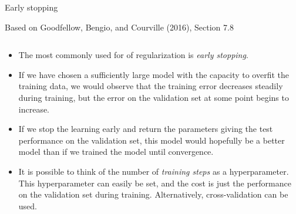 \documentclass[10pt,ignorenonframetext,]{beamer}
\providecommand{\tightlist}{%
  \setlength{\itemsep}{0pt}\setlength{\parskip}{0pt}}
\begin{document}
\begin{frame}

\begin{block}{Early stopping}

\tiny Based on Goodfellow, Bengio, and Courville (2016), Section 7.8

\normalsize

\(~\)

\begin{itemize}
\tightlist
\item
  The most commonly used for of regularization is \emph{early stopping}.
\end{itemize}

\vspace{2mm}

\begin{itemize}
\tightlist
\item
  If we have chosen a sufficiently large model with the capacity to
  overfit the training data, we would observe that the training error
  decreases steadily during training, but the error on the validation
  set at some point begins to increase.
\end{itemize}

\vspace{2mm}

\begin{itemize}
\tightlist
\item
  If we stop the learning early and return the parameters giving the
  test performance on the validation set, this model would hopefully be
  a better model than if we trained the model until convergence.
\end{itemize}

\vspace{2mm}

\begin{itemize}
\tightlist
\item
  It is possible to think of the number of \emph{training steps} as a
  hyperparameter. This hyperparameter can easily be set, and the cost is
  just the performance on the validation set during training.
  Alternatively, cross-validation can be used.
\end{itemize}

\end{block}

\end{frame}
\end{document}
